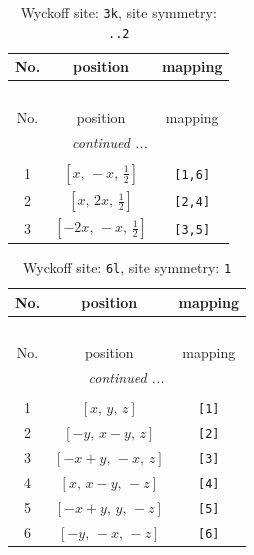 \documentclass[fleqn,8pt]{jsarticle}
\begin{document}
\begin{longtable}{ccc}
\caption{Wyckoff site: {\tt 3k}, site symmetry: {\tt ..2}}
 \\
 \hline \hline
No. & position & mapping \\ \hline \endfirsthead

\multicolumn{2}{l}{\tablename\ \thetable{}} \\
 \hline \hline
No. & position & mapping \\ \hline \endhead

 \hline \hline
\multicolumn{2}{r}{\footnotesize\it continued ...} \\ \endfoot

 \hline \hline
\multicolumn{2}{r}{} \\ \endlastfoot

1 & $\left[ x,\, - x,\, \frac{1}{2} \right]$ & {\tt [1,6]} \\ \hline
2 & $\left[ x,\, 2 x,\, \frac{1}{2} \right]$ & {\tt [2,4]} \\ \hline
3 & $\left[ - 2 x,\, - x,\, \frac{1}{2} \right]$ & {\tt [3,5]} \\
\end{longtable}
\renewcommand{\arraystretch}{1.2}
\begin{longtable}{ccc}
\caption{Wyckoff site: {\tt 6l}, site symmetry: {\tt 1}}
 \\
 \hline \hline
No. & position & mapping \\ \hline \endfirsthead

\multicolumn{2}{l}{\tablename\ \thetable{}} \\
 \hline \hline
No. & position & mapping \\ \hline \endhead

 \hline \hline
\multicolumn{2}{r}{\footnotesize\it continued ...} \\ \endfoot

 \hline \hline
\multicolumn{2}{r}{} \\ \endlastfoot

1 & $\left[ x,\, y,\, z \right]$ & {\tt [1]} \\ \hline
2 & $\left[ - y,\, x - y,\, z \right]$ & {\tt [2]} \\ \hline
3 & $\left[ - x + y,\, - x,\, z \right]$ & {\tt [3]} \\ \hline
4 & $\left[ x,\, x - y,\, - z \right]$ & {\tt [4]} \\ \hline
5 & $\left[ - x + y,\, y,\, - z \right]$ & {\tt [5]} \\ \hline
6 & $\left[ - y,\, - x,\, - z \right]$ & {\tt [6]} \\
\end{longtable}
\end{document}
